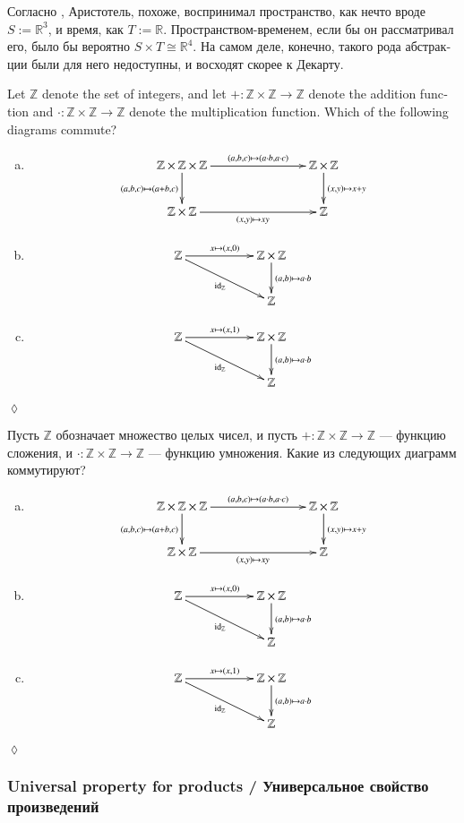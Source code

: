 \documentclass[a4paper]{book}
\def\tn{\textnormal}
\def\ZZ{{\mathbb Z}}
\def\RR{{\mathbb R}}
\def\hsp{\hspace{.3in}}
\def\to{\rightarrow}
\def\taking{\colon}
\def\iso{\cong}
\def\id{\tn{id}}
\theoremstyle{myth}
\newtheorem{excENG}[envENG]{\begin{english}Exercise\end{english}}
\newenvironment{exerciseENG}{\begin{excENG}}{\hspace*{\fill}$\lozenge$\end{excENG}}
\newtheorem{exampleRUS}[envRUS]{\begin{russian}Пример\end{russian}}
\newtheorem{excRUS}[envRUS]{\begin{russian}Упражнение\end{russian}}
\newenvironment{exerciseRUS}{\begin{excRUS}}{\hspace*{\fill}$\lozenge$\end{excRUS}}
\def\sexc{\begin{enumerate}[a.)]\setlength{\itemsep}{.1cm}\setlength{\parskip}{.1cm}\item}
\def\next{\item}
\def\endsexc{\end{enumerate}}
\begin{document}
\begin{english}
\begin{exampleRUS}
\begin{russian}
Согласно \cite{Pen}, Аристотель, похоже, воспринимал пространство, как нечто вроде $S:=\RR^3$, и время, как $T:=\RR$. Пространством-временем, если бы он рассматривал его, было бы вероятно $S\times T\iso\RR^4$. На самом деле, конечно, такого рода абстракции были для него недоступны, и восходят скорее к Декарту. \end{russian}
\end{exampleRUS}

\begin{exerciseENG}
Let $\ZZ$ denote the set of integers, and let $+\taking\ZZ\times\ZZ\to\ZZ$ denote the addition function and $\cdot\taking\ZZ\times\ZZ\to\ZZ$ denote the multiplication function. Which of the following diagrams commute?
\sexc $$\xymatrix{
\ZZ\times\ZZ\times\ZZ\ar[rr]^-{(a,b,c)\mapsto(a\cdot b,a\cdot c)}\ar[d]_{(a,b,c)\mapsto(a+b,c)}&\hsp&\ZZ\times\ZZ\ar[d]^{(x,y)\mapsto x+y}\\
\ZZ\times\ZZ\ar[rr]_{(x,y)\mapsto xy}&&\ZZ}
$$
\next $$
\xymatrix{
\ZZ\ar[rr]^{x\mapsto (x,0)}\ar[drr]_{\id_\ZZ}&&\ZZ\times\ZZ\ar[d]^{(a,b)\mapsto a\cdot b}\\&&\ZZ}
$$
\next$$
\xymatrix{
\ZZ\ar[rr]^{x\mapsto (x,1)}\ar[drr]_{\id_\ZZ}&&\ZZ\times\ZZ\ar[d]^{(a,b)\mapsto a\cdot b}\\&&\ZZ}
$$
\endsexc
\end{exerciseENG}

\begin{exerciseRUS}
\begin{russian}Пусть $\ZZ$ обозначает множество целых чисел, и пусть $+\taking\ZZ\times\ZZ\to\ZZ$ — функцию сложения, и $\cdot\taking\ZZ\times\ZZ\to\ZZ$ — функцию умножения. Какие из следующих диаграмм коммутируют?
\sexc $$\xymatrix{
\ZZ\times\ZZ\times\ZZ\ar[rr]^-{(a,b,c)\mapsto(a\cdot b,a\cdot c)}\ar[d]_{(a,b,c)\mapsto(a+b,c)}&\hsp&\ZZ\times\ZZ\ar[d]^{(x,y)\mapsto x+y}\\
\ZZ\times\ZZ\ar[rr]_{(x,y)\mapsto xy}&&\ZZ}
$$
\next $$
\xymatrix{
\ZZ\ar[rr]^{x\mapsto (x,0)}\ar[drr]_{\id_\ZZ}&&\ZZ\times\ZZ\ar[d]^{(a,b)\mapsto a\cdot b}\\&&\ZZ}
$$
\next$$
\xymatrix{
\ZZ\ar[rr]^{x\mapsto (x,1)}\ar[drr]_{\id_\ZZ}&&\ZZ\times\ZZ\ar[d]^{(a,b)\mapsto a\cdot b}\\&&\ZZ}
$$
\endsexc\end{russian}
\end{exerciseRUS}


\subsubsection{Universal property for products / Универсальное свойство произведений}


\end{english}
\end{document}
